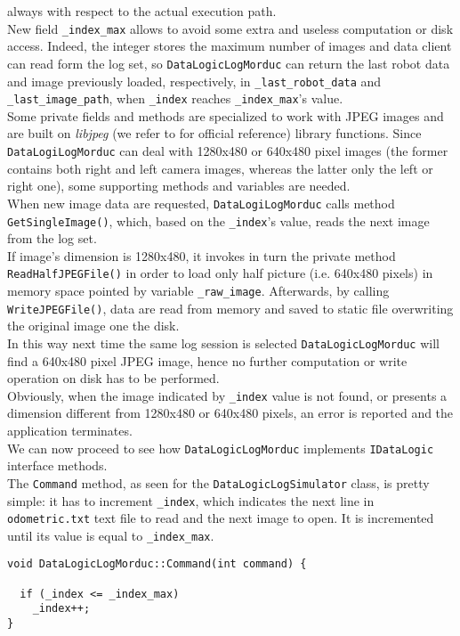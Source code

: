 always with respect to the actual execution path.
\\
New field \texttt{\_index\_max} allows to avoid some extra and
useless computation or disk access. Indeed, the integer stores
the maximum number
of images and data client can read form the log set, so
\texttt{DataLogicLogMorduc}  can
return the last robot data and image previously loaded, respectively,
in \texttt{\_last\_robot\_data} and \texttt{\_last\_image\_path},
when \texttt{\_index}
reaches \texttt{\_index\_max}'s value.
\\
Some private fields and methods are specialized to work with JPEG
images and are built on \textit{libjpeg} (we refer to \cite{library:libjpeg}
for official reference) library functions.
Since \texttt{DataLogiLogMorduc} can deal with 1280x480
or 640x480 pixel images (the former contains both right and left
camera images, whereas the latter only the left or right one),
some supporting methods and variables are needed.
\\
When new image data are requested, \texttt{DataLogiLogMorduc}
calls method \texttt{GetSingleImage()}, which, based on the
\texttt{\_index}'s value, reads the next image from the log set.
\\
If image's dimension is 1280x480, it invokes in turn the private method
\texttt{ReadHalfJPEGFile()} in order to load only half 
picture (i.e. 640x480 pixels) in memory space pointed by variable
\texttt{\_raw\_image}. Afterwards, by calling \texttt{WriteJPEGFile()},
data are read from memory and saved to static file overwriting the
original image one the disk.
\\
In this way next time the same log session is selected \texttt{DataLogicLogMorduc}
will find a 640x480 pixel JPEG image, hence no further computation
or write operation on disk has to be performed.
\\
Obviously, when the image indicated by \texttt{\_index} value is
not found, or presents a dimension different from 1280x480 or
640x480 pixels, an error is reported and the application terminates.
\\
We can now proceed to see how \texttt{DataLogicLogMorduc} implements
\texttt{IDataLogic} interface methods.
\\
The \texttt{Command} method, as seen for the \texttt{DataLogicLogSimulator}
class, is pretty simple: it has to increment \texttt{\_index},
which indicates the next line in \texttt{odometric.txt}
text file to read and the next image to open. It is incremented until
its value is equal to \texttt{\_index\_max}.
\\
\begin{lstlisting}[caption={\texttt{DataLogicLogMorduc::Command() method}},
    label={code:datalogiclogmorduc:command}]
void DataLogicLogMorduc::Command(int command) {

  if (_index <= _index_max)
    _index++;
}
\end{lstlisting}

